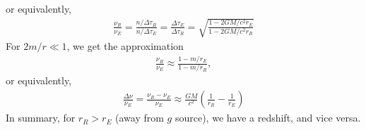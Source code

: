 \documentclass{book}
\theoremstyle{definition}
\newcommand{\f}[2]{\frac{#1}{#2}}
\newcommand{\lp}{\left(}
\newcommand{\rp}{\right)}
\begin{document}
or equivalently,
\begin{align*}
\boxed{
\f{\nu_R}{\nu_E}
= 
\f{n/\Delta \tau_R}{n / \Delta \tau_E}
=
\f{\Delta \tau_E}{\Delta \tau_R}
=
\sqrt{
\f{1 - 2GM/c^2 r_E}{1 - 2GM / c^2 r_R}
}
}
\end{align*}
For $2m / r \ll 1$, we get the approximation
\begin{align*}
\f{\nu_R}{\nu_E} \approx \f{1 - m/r_E}{1 - m/r_R},
\end{align*}
or equivalently,
\begin{align*}
\boxed{
\f{\Delta \nu}{\nu_E} = \f{\nu_R - \nu_E}{\nu_E} \approx \f{GM}{c^2}\lp \f{1}{r_R}- \f{1}{r_E} \rp
}
\end{align*}
In summary, for $r_R > r_E$ (away from $g$ source), we have a redshift, and vice versa. \\
\end{document}
